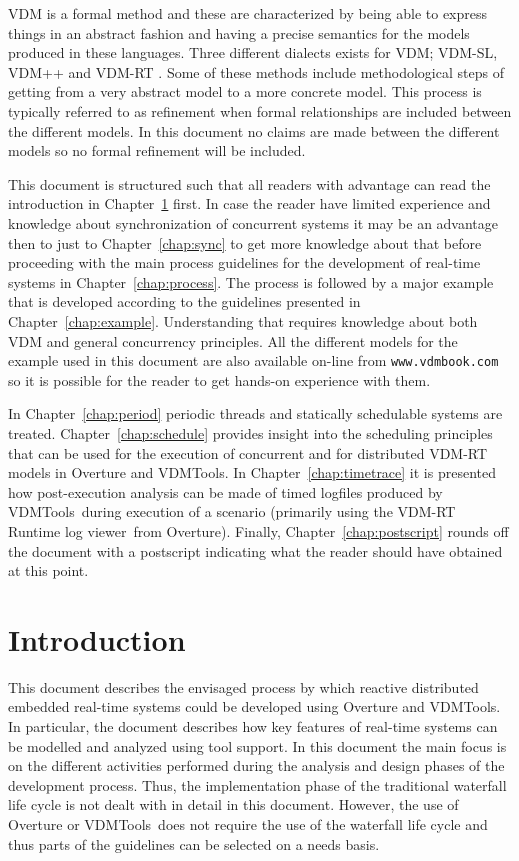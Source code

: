 \documentclass{overturerepchap}
\newcommand{\VDMTools}{VDMTools}
\newcommand{\showtrace}{VDM-RT Runtime log viewer}
\newcommand{\url}[1]{\texttt{#1}}
\begin{document}
VDM \cite{Jones90a,Dawes91,Fitzgerald&98} is a formal method
\cite{Craigen&93b,Hinchey&95} and these are characterized by being
able to express things in an abstract fashion and having a precise
semantics for the models produced in these languages. Three different
dialects exists for VDM;
VDM-SL, VDM++ and VDM-RT \cite{Larsen&10b}. Some of these
methods include methodological steps of getting from a very abstract
model to a more concrete model. This process is typically referred to
as refinement \cite{Jones90a,Morgan90a,Woodcock&96,Back&98} when formal
relationships are included between the different models. In this
document no claims are made between the different models so no formal
refinement will be included.

This document is structured such that all readers with advantage can
read the introduction in Chapter~\ref{chap:intro} first. In case the
reader have limited experience and knowledge about synchronization of
concurrent systems it may be an advantage then to just to
Chapter~\ref{chap:sync} to get more knowledge about that before
proceeding with the main process guidelines for the development of
real-time systems in Chapter~\ref{chap:process}. The process is followed
by a major example that is developed according to the guidelines
presented in Chapter~\ref{chap:example}. Understanding that requires
knowledge about both VDM and general concurrency principles. All the 
different models for the example used in this document are also available
on-line from \url{www.vdmbook.com} so it is possible for the reader to 
get hands-on experience with them.

In 
Chapter~\ref{chap:period} periodic threads and statically schedulable
systems are treated. Chapter~\ref{chap:schedule} provides insight 
into the scheduling principles that can be used for the execution of
concurrent and for distributed VDM-RT models in Overture and \VDMTools. In 
Chapter~\ref{chap:timetrace} it is presented how post-execution analysis
can be made of timed logfiles produced by \VDMTools\ during execution 
of a scenario (primarily using the \showtrace\ from Overture). 
Finally, Chapter~\ref{chap:postscript} rounds off the document with a 
postscript indicating what the reader should have obtained at this point.


\chapter{Introduction}\label{chap:intro}

This document describes the envisaged process by which reactive
distributed embedded real-time
systems could be developed using Overture and \VDMTools. In particular, the
document describes how key features of real-time systems can be
modelled and analyzed using tool support.  In this document the main
focus is on the different activities performed during the analysis and
design phases of the development process. Thus, the implementation
phase of the traditional waterfall life cycle \cite{Royce70} is not
dealt with in detail in this document. However, the use of Overture or
\VDMTools\
does not require the use of the waterfall life cycle and thus parts of
the guidelines can be selected on a needs basis.
\end{document}
